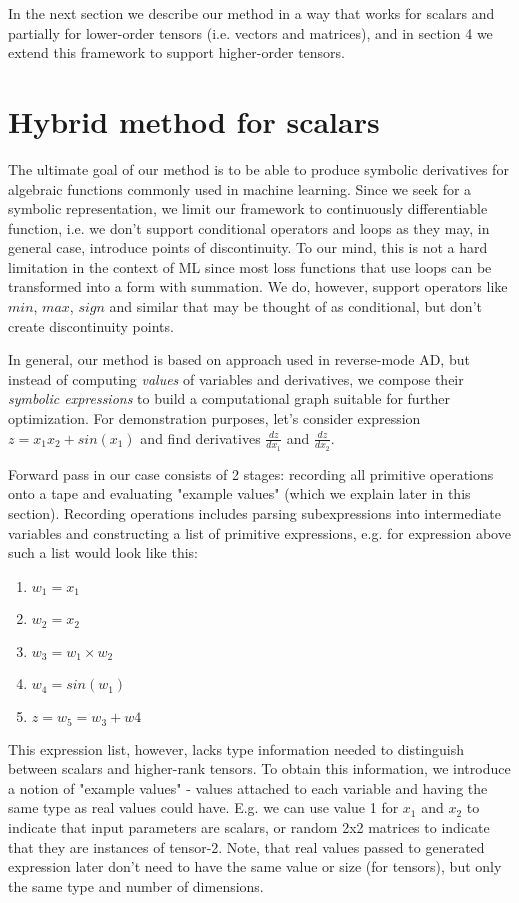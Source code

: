\documentclass[conference]{IEEEtran}
\begin{document}
In the next section we describe our method in a way that works for
scalars and partially for lower-order tensors (i.e. vectors and
matrices), and in section 4 we extend this framework to support
higher-order tensors.

\section{Hybrid method for scalars}

The ultimate goal of our method is to be able to produce symbolic
derivatives for algebraic functions commonly used in machine
learning. Since we seek for a symbolic representation, we limit our
framework to continuously differentiable function, i.e. we don't
support conditional operators and loops as they may, in general case,
introduce points of discontinuity. To our mind, this is not a hard
limitation in the context of ML since most loss functions that use
loops can be transformed into a form with summation. We do, however,
support operators like $min$, $max$, $sign$ and similar that may be
thought of as conditional, but don't create discontinuity points.

In general, our method is based on approach used in reverse-mode AD,
but instead of computing \textit{values} of variables and derivatives,
we compose their \textit{symbolic expressions} to build a
computational graph suitable for further optimization. For
demonstration purposes, let's consider expression
$z = x_1x_2 + sin(x_1)$ and find derivatives $\frac{dz}{dx_1}$ and
$\frac{dz}{dx_2}$.

Forward pass in our case consists of 2 stages: recording all primitive
operations onto a tape and evaluating "example values" (which we
explain later in this section). Recording operations includes parsing
subexpressions into intermediate variables and constructing a list of
primitive expressions, e.g. for expression above such a list would
look like this:

\begin{enumerate}
\item $w_1 = x_1$
\item $w_2 = x_2$
\item $w_3 = w_1 \times w_2$
\item $w_4 = sin(w_1)$
\item $z = w_5 = w_3 + w4$
\end{enumerate}

This expression list, however, lacks type information needed to
distinguish between scalars and higher-rank tensors. To obtain this
information, we introduce a notion of "example values" - values
attached to each variable and having the same type as real values
could have. E.g. we can use value 1 for $x_1$ and $x_2$ to indicate
that input parameters are scalars, or random 2x2 matrices to indicate
that they are instances of tensor-2. Note, that real values passed to
generated expression later don't need to have the same value or size
(for tensors), but only the same type and number of dimensions.
\end{document}

